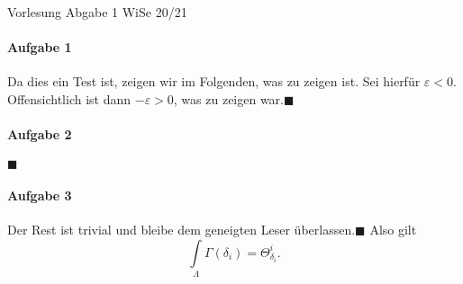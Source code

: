 \documentclass[a4paper]{article}
\begin{document}
\renewcommand{\rmdefault}{\sfdefault}
\newcommand{\quoderat}{\hfill$\blacksquare$}
\setlength{\parindent}{0pt}
\pagestyle{fancy}
\lhead
  {
  Vorlesung}
\chead
  {
  \Large Abgabe 1}
\rhead
  {
  WiSe 20/21}
\paragraph{Aufgabe 1} Da dies ein Test ist, zeigen wir im Folgenden, was zu zeigen ist. Sei hierfür $\varepsilon < 0$.
Offensichtlich ist dann $-\varepsilon > 0$, was zu zeigen war.\quoderat
\paragraph{Aufgabe 2} \blindtext\quoderat
\paragraph{Aufgabe 3} \blindtext Der Rest ist trivial und bleibe dem geneigten Leser überlassen.\quoderat
Also gilt
\[\int\limits_\Lambda \Gamma(\delta_i)=\Theta^i_{\delta_i}.\]
\blindtext
\cfoot
  {
  \hphantom{X}}
\rfoot
  {\thepage}
\end{document}
